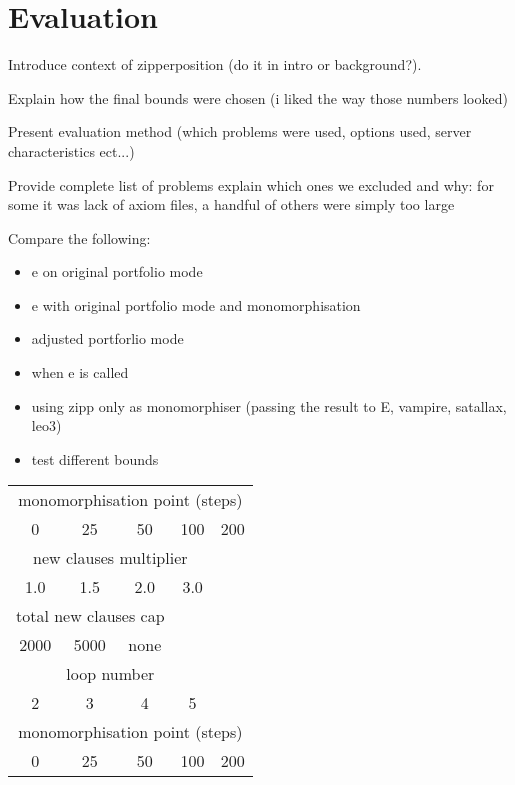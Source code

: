 \documentclass{article}
\begin{document}
\break

\section{Evaluation}

Introduce context of zipperposition (do it in intro or background?).

Explain how the final bounds were chosen (i liked the way those numbers looked)

Present evaluation method (which problems were used, options used, server characteristics ect...)



Provide complete list of problems explain which ones we excluded and why: for some it was lack of axiom files, a handful of others were simply too large

Compare the following:
    \begin{itemize}
        \item e on original portfolio mode
        \item e with original portfolio mode and monomorphisation
        \item adjusted portforlio mode 

        \item when e is called
        \item using zipp only as monomorphiser (passing the result to E, vampire, satallax, leo3)

        \item test different bounds
    \end{itemize}

\break

\begin{center}
\begin{tabular}{ccccc}
   \toprule
   \multicolumn{5}{c}{monomorphisation point (steps)} \\
   0 & 25 & 50 & 100 & 200 \\
   \midrule
   \multicolumn{4}{c}{new clauses multiplier} \\
   1.0 & 1.5 & 2.0 & 3.0 \\
   \midrule
   \multicolumn{3}{c}{total new clauses cap} \\
   2000 & 5000 & none\\
   \midrule
   \multicolumn{4}{c}{loop number} \\
   2 & 3 & 4 & 5 \\
   \midrule
   \multicolumn{5}{c}{monomorphisation point (steps)} \\
   0 & 25 & 50 & 100 & 200 \\

   \bottomrule
\end{tabular}
\end{center}
\end{document}
